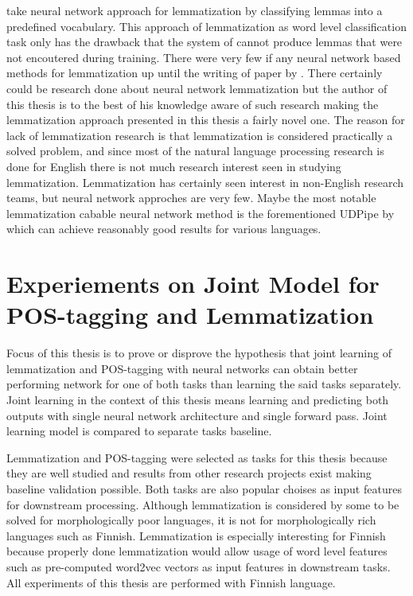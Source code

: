 \documentclass[12pt,a4paper,english
]{tutthesis}
\begin{document}
\cite{Kestemont2016} take neural network approach for lemmatization by classifying lemmas into a predefined vocabulary. This approach of lemmatization as word level classification task only has the drawback that the system of \cite{Kestemont2016} cannot produce lemmas that were not encoutered during training. There were very few if any neural network based methods for lemmatization up until the writing of paper by \cite{Kestemont2016}. There certainly could be research done about neural network lemmatization but the author of this thesis is to the best of his knowledge aware of such research making the lemmatization approach presented in this thesis a fairly novel one. The reason for lack of lemmatization research is that lemmatization is considered practically a solved problem, and since most of the natural language processing research is done for English there is not much research interest seen in studying lemmatization. Lemmatization has certainly seen interest in non-English research teams, but neural network approches are very few. Maybe the most notable lemmatization cabable neural network method is the forementioned UDPipe by \cite{Straka2016} which can achieve reasonably good results for various languages. 


\chapter{Experiements on Joint Model for POS-tagging and Lemmatization}
\label{ch:experiements_on_joint_model_for_pos_tagging_and_lemmatization}
Focus of this thesis is to prove or disprove the hypothesis that joint learning of lemmatization and POS-tagging with neural networks can obtain better performing network for one of both tasks than learning the said tasks separately. Joint learning in the context of this thesis means learning and predicting both outputs with single neural network architecture and single forward pass. Joint learning model is compared to separate tasks baseline.

Lemmatization and POS-tagging were selected as tasks for this thesis because they are well studied and results from other research projects exist making baseline validation possible. Both tasks are also popular choises as input features for downstream processing. Although lemmatization is considered by some to be solved for morphologically poor languages, it is not for morphologically rich languages such as Finnish. Lemmatization is especially interesting for Finnish because properly done lemmatization would allow usage of word level features such as pre-computed word2vec vectors as input features in downstream tasks. All experiments of this thesis are performed with Finnish language.
\end{document}

